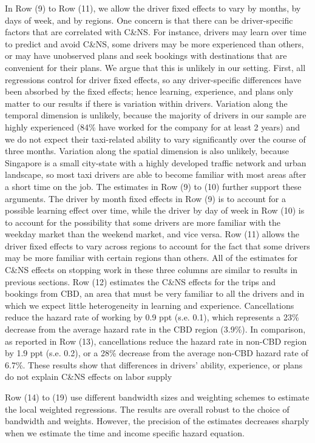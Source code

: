 \documentclass[reviewmode,AEJ]{AEA}
\begin{document}
In Row (9) to Row (11), we allow the driver fixed effects to vary by months, by days of week, and by regions. One concern is that there can be driver-specific factors that  are correlated with C\&NS. For instance, drivers may learn over time to predict and avoid C\&NS, some drivers may be more experienced than others, or may have unobserved plans and seek bookings with destinations that are convenient for their plans. We argue that this is unlikely in our setting. First, all regressions control for driver fixed effects, so any driver-specific differences have been absorbed by the fixed effects;
hence learning, experience, and plans only matter to our results if there is variation within drivers. 
Variation along the temporal dimension is unlikely, because the majority of drivers in our sample are highly
experienced (84\% have worked for the company for at least 2 years) and we do not expect their taxi-related
ability to vary significantly over the course of three months. Variation along the spatial dimension is also
unlikely, because Singapore is a small city-state with a highly developed traffic network and urban landscape,
so most taxi drivers are able to become familiar with most areas after a short time on the job. The estimates in Row (9) to (10) further support these arguments. The driver by month fixed effects in Row (9) is to account for a possible learning effect over time, while the driver by day of week in Row (10) is to account for the possibility that some drivers are more familiar with the weekday market than the weekend market, and vice versa. Row (11) allows the driver fixed effects to vary across regions to account for the fact 
that some drivers may be more familiar with certain regions than others. All of the estimates for C\&NS effects
on stopping work in these three columns are similar to results in previous sections. Row (12) estimates the C\&NS effects for the trips and bookings from CBD, an area that must be very familiar to all the drivers and in which we expect little heterogeneity in
learning and experience. Cancellations reduce the hazard rate of working by 0.9 ppt (s.e. 0.1), which 
represents a 23\% decrease from the average hazard rate in the CBD region (3.9\%). In comparison, as
reported in Row (13), cancellations reduce the hazard rate in non-CBD region by 1.9 ppt (s.e. 0.2), 
or a 28\% decrease from the average non-CBD hazard rate of 6.7\%. These results show that differences in
drivers' ability, experience, or plans do not explain C\&NS effects on labor supply


Row (14) to (19) use different bandwidth sizes and weighting schemes to estimate the local weighted regressions. The results are overall robust to the choice of bandwidth and weights. However, the precision of the estimates decreases sharply when we estimate the time and income specific hazard equation.
\end{document}
